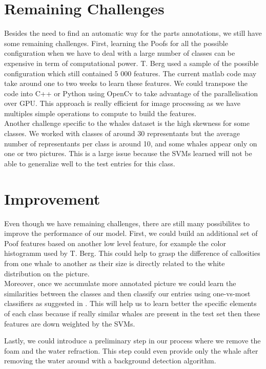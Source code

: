 \documentclass[twoside]{article}
\begin{document}
\begin{multicols}{2}
\section{Remaining Challenges}

Besides the need to find an automatic way for the parts annotations, we still have some remaining challenges. First, learning the Poofs for all the possible configuration when we have to deal with a large number of classes can be expensive in term of computational power. T. Berg used a sample of the possible configuration which still contained 5 000 features. The current matlab code may take around one to two weeks to learn these features. We could transpose the code into C++ or Python using OpenCv to take advantage of the parallelisation over GPU. This approach is really efficient for image processing as we have multiples simple operations to compute to build the features.\\

Another challenge specific to the whales dataset is the high skewness for some classes. We worked with classes of around 30 representants but the average number of representants per class is around 10, and some whales appear only on one or two pictures. This is a large issue because the SVMs learned will not be able to generalize well to the test entries for this class. 

\section{Improvement}

Even though we have remaining challenges, there are still many possibilites to improve the performance of our model. First, we could build an additional set of Poof features based on another low level feature, for example the color histogramm used by T. Berg. This could help to grasp the difference of callosities from one whale to another as their size is directly related to the white distribution on the picture.\\

Moreover, once we accumulate more annotated picture we could learn the similarities between the classes and then classify our entries using one-vs-most classifiers as suggested in \cite{snap}. This will help us to learn better the specific elements of each class because if really similar whales are present in the test set then these features are down weighted by the SVMs.

Lastly, we could introduce a preliminary step in our process where we remove the foam and the water refraction. This step could even provide only the whale after removing the water around with a background detection algorithm.


\end{multicols}
\end{document}
